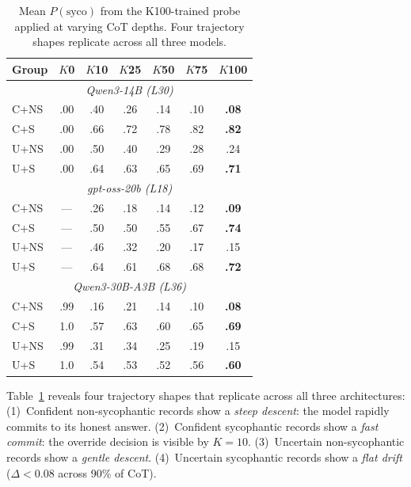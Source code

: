 \documentclass[11pt]{article}
\begin{document}
\begin{table}[t]
\caption{Mean $P(\text{syco})$ from the K100-trained probe applied at varying CoT depths. Four trajectory shapes replicate across all three models.}
\label{tab:trajectories}
\begin{center}
\begin{small}
\begin{sc}
\setlength{\tabcolsep}{4pt}
\begin{tabular}{lcccccc}
\toprule
Group & $K$0 & $K$10 & $K$25 & $K$50 & $K$75 & $K$100 \\
\midrule
\multicolumn{7}{c}{\textnormal{\emph{Qwen3-14B (L30)}}} \\
C+NS & .00 & .40 & .26 & .14 & .10 & \textbf{.08} \\
C+S  & .00 & .66 & .72 & .78 & .82 & \textbf{.82} \\
U+NS & .00 & .50 & .40 & .29 & .28 & .24 \\
U+S  & .00 & .64 & .63 & .65 & .69 & \textbf{.71} \\
\midrule
\multicolumn{7}{c}{\textnormal{\emph{gpt-oss-20b (L18)}}} \\
C+NS & --- & .26 & .18 & .14 & .12 & \textbf{.09} \\
C+S  & --- & .50 & .50 & .55 & .67 & \textbf{.74} \\
U+NS & --- & .46 & .32 & .20 & .17 & .15 \\
U+S  & --- & .64 & .61 & .68 & .68 & \textbf{.72} \\
\midrule
\multicolumn{7}{c}{\textnormal{\emph{Qwen3-30B-A3B (L36)}}} \\
C+NS & .99 & .16 & .21 & .14 & .10 & \textbf{.08} \\
C+S  & 1.0 & .57 & .63 & .60 & .65 & \textbf{.69} \\
U+NS & .99 & .31 & .34 & .25 & .19 & .15 \\
U+S  & 1.0 & .54 & .53 & .52 & .56 & \textbf{.60} \\
\bottomrule
\end{tabular}
\end{sc}
\end{small}
\end{center}
\end{table}

Table~\ref{tab:trajectories} reveals four trajectory shapes that replicate across all three architectures:
(1)~Confident non-sycophantic records show a \emph{steep descent}: the model rapidly commits to its honest answer.
(2)~Confident sycophantic records show a \emph{fast commit}: the override decision is visible by $K{=}10$.
(3)~Uncertain non-sycophantic records show a \emph{gentle descent}.
(4)~Uncertain sycophantic records show a \emph{flat drift} ($\Delta < 0.08$ across 90\% of CoT).
\end{document}
